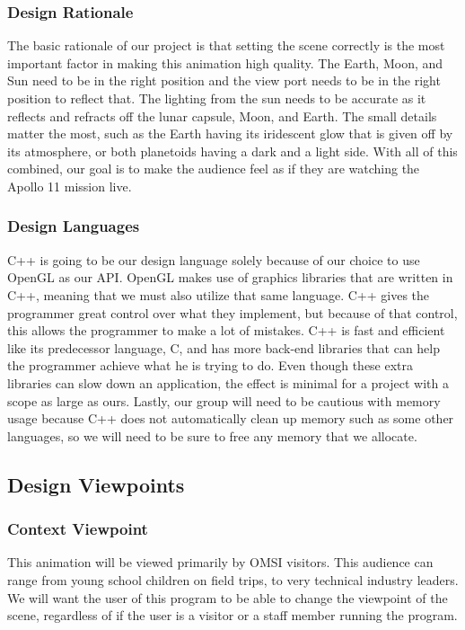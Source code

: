 \documentclass[onecolumn, draftclsnofoot,10pt, compsoc]{IEEEtran}
\begin{document}
    \subsubsection{Design Rationale}
	The basic rationale of our project is that setting the scene correctly is the most important factor in making this animation high quality. The Earth, Moon, and Sun need to be in the right position and the view port needs to be in the right position to reflect that. The lighting from the sun needs to be accurate as it reflects and refracts off the lunar capsule, Moon, and Earth. The small details matter the most, such as the Earth having its iridescent glow that is given off by its atmosphere, or both planetoids having a dark and a light side. With all of this combined, our goal is to make the audience feel as if they are watching the Apollo 11 mission live.
	
    \subsubsection{Design Languages}
	C++ is going to be our design language solely because of our choice to use OpenGL as our API. OpenGL makes use of graphics libraries that are written in C++, meaning that we must also utilize that same language. C++ gives the programmer great control over what they implement, but because of that control, this allows the programmer to make a lot of mistakes. C++ is fast and efficient like its predecessor language, C, and has more back-end libraries that can help the programmer achieve what he is trying to do. Even though these extra libraries can slow down an application, the effect is minimal for a project with a scope as large as ours. Lastly, our group will need to be cautious with memory usage because C++ does not automatically clean up memory such as some other languages, so we will need to be sure to free any memory that we allocate. 


\subsection{Design Viewpoints}

    \subsubsection{Context Viewpoint}
    
    This animation will be viewed primarily by OMSI visitors. This audience can range from young school children on field trips, to very technical industry leaders. We will want the user of this program to be able to change the viewpoint of the scene, regardless of if the user is a visitor or a staff member running the program.  
    
\end{document}
